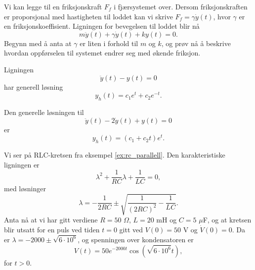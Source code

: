 \documentclass{article}
\theoremstyle{definition}
\theoremstyle{remark}
\newenvironment{ex}
{\pushQED{\qed}\renewcommand{\qedsymbol}{$\triangle$}\exx}
{\popQED\endexx}
\begin{document}
\begin{multicols*}{2}
\begin{ex}
  Vi kan legge til en friksjonskraft $F_f$ i fjærsystemet over. Dersom friksjonskraften er proporsjonal med hastigheten til loddet kan vi skrive $F_f = \gamma \dot{y}(t)$, hvor $\gamma$ er en friksjonskoeffisient. Ligningen for bevegelsen til loddet blir nå
  \begin{equation*}
    m \ddot{y}(t) + \gamma \dot{y}(t) + ky(t) = 0.
  \end{equation*}
  Begynn med å anta at $\gamma$ er liten i forhold til $m$ og $k$, og prøv nå å beskrive hvordan oppførselen til systemet endrer seg med økende friksjon.
\end{ex}

\begin{ex}
  Ligningen
  \begin{equation*}
    \ddot{y}(t) - y(t) = 0
  \end{equation*}
  har generell løsning
  \begin{equation*}
    y_h(t) = c_1 e^{t} + c_2 e^{-t}.
  \end{equation*}
\end{ex}

\begin{ex}
  Den generelle løsningen til
  \begin{equation*}
    \ddot{y}(t) - 2 \dot{y}(t) + y(t) = 0
  \end{equation*}
  er
  \begin{equation*}
    y_h(t) = (c_1 + c_2 t) e^t.
  \end{equation*}
\end{ex}

\begin{ex}
  Vi ser på RLC-kretsen fra eksempel \ref{ex:rc_parallell}. Den karakteristiske ligningen er
  \begin{equation*}
    \lambda^2 + \frac{1}{RC} \lambda + \frac{1}{LC} = 0,
  \end{equation*}
  med løsninger
  \begin{equation*}
    \lambda = - \frac{1}{2 R C} \pm \sqrt{\frac{1}{(2 R C)^2} - \frac{1}{LC}}.
  \end{equation*}
  Anta nå at vi har gitt verdiene $R = 50$ $\Omega$, $L = 20 $ mH og $C = 5$ $\mu$F, og at kretsen blir utsatt for en puls ved tiden $t = 0$ gitt ved $V(0) = 50$ V og $\dot{V}(0) = 0$. Da er $\lambda = -2000 \pm \sqrt{6 \cdot 10^6}$, og spenningen over kondensatoren er
  \begin{equation*}
    V(t) = 50 e^{- 2000 t} \cos(\sqrt{6 \cdot 10^6} t),
  \end{equation*}
  for $t > 0$.
\end{ex}


\end{multicols*}
\end{document}
